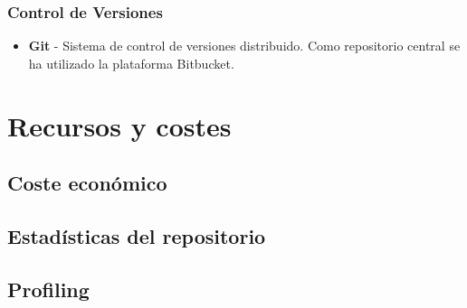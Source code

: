 \subsubsection{Control de Versiones}
\begin{itemize}
\item \textbf{Git} - Sistema de control de versiones distribuido. Como repositorio central se ha utilizado la plataforma Bitbucket.
\end{itemize}


\section{Recursos y costes}
\subsection{Coste económico}
\subsection{Estadísticas del repositorio}
\subsection{Profiling}